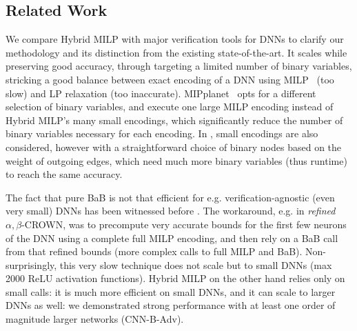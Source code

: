 \subsection{Related Work} 

We compare Hybrid MILP with major verification tools for DNNs to clarify our methodology and its distinction from the existing state-of-the-art. It scales while preserving good accuracy, through targeting a limited number of binary variables, stricking a good balance between exact encoding of a DNN using MILP~\cite{MILP} (too slow) and LP relaxation (too inaccurate). MIPplanet~\cite{MIPplanet} opts for a different selection of binary variables, and execute one large MILP encoding instead of Hybrid MILP's many small encodings, which significantly reduce the number of binary variables necessary for each encoding. In \cite{DivideAndSlide}, small encodings are also considered, however with a straightforward choice of binary nodes based on the weight of outgoing edges, which need much more {binary variables} (thus runtime) to reach the same accuracy.

The fact that pure BaB is not that efficient for e.g. verification-agnostic (even very small) DNNs has been witnessed before \cite{MILP2}. The workaround, e.g. in {\em refined} $\alpha,\beta$-CROWN, was to precompute very accurate bounds for the first few neurons of the DNN using a complete full MILP encoding, and then rely on a BaB call from that refined bounds (more complex calls to full MILP and BaB). Non-surprisingly, this very slow technique does not scale but to small DNNs (max 2000 ReLU activation functions). Hybrid MILP on the other hand relies only on small calls: it is much more efficient on small DNNs, and it can scale to larger DNNs as well: we demonstrated strong performance with at least one order of magnitude larger networks (CNN-B-Adv).



